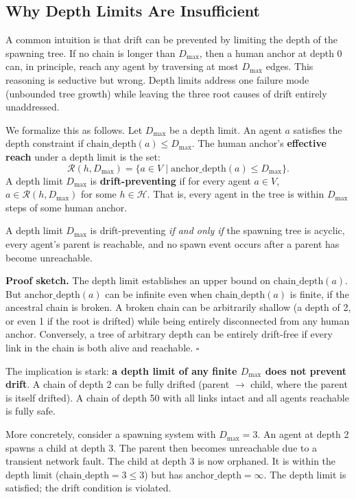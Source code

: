 \subsection{Why Depth Limits Are Insufficient}

A common intuition is that drift can be prevented by limiting the depth of the spawning tree. If no chain is longer than $D_{\max}$, then a human anchor at depth $0$ can, in principle, reach any agent by traversing at most $D_{\max}$ edges. This reasoning is seductive but wrong. Depth limits address one failure mode (unbounded tree growth) while leaving the three root causes of drift entirely unaddressed.

We formalize this as follows. Let $D_{\max}$ be a depth limit. An agent $a$ satisfies the depth constraint if $\text{chain\_depth}(a) \leq D_{\max}$. The human anchor's \textbf{effective reach} under a depth limit is the set:
\[
\mathcal{R}(h, D_{\max}) = \{ a \in V \mid \text{anchor\_depth}(a) \leq D_{\max} \}.
\]
A depth limit $D_{\max}$ is \textbf{drift-preventing} if for every agent $a \in V$, $a \in \mathcal{R}(h, D_{\max})$ for some $h \in \mathcal{H}$. That is, every agent in the tree is within $D_{\max}$ steps of some human anchor.

\begin{claim}
A depth limit $D_{\max}$ is drift-preventing \emph{if and only if} the spawning tree is acyclic, every agent's parent is reachable, and no spawn event occurs after a parent has become unreachable.
\end{claim}

\textbf{Proof sketch.} The depth limit establishes an upper bound on $\text{chain\_depth}(a)$. But $\text{anchor\_depth}(a)$ can be infinite even when $\text{chain\_depth}(a)$ is finite, if the ancestral chain is broken. A broken chain can be arbitrarily shallow (a depth of 2, or even 1 if the root is drifted) while being entirely disconnected from any human anchor. Conversely, a tree of arbitrary depth can be entirely drift-free if every link in the chain is both alive and reachable. $\square$

The implication is stark: \textbf{a depth limit of any finite $D_{\max}$ does not prevent drift}. A chain of depth 2 can be fully drifted (parent $\rightarrow$ child, where the parent is itself drifted). A chain of depth 50 with all links intact and all agents reachable is fully safe.

More concretely, consider a spawning system with $D_{\max} = 3$. An agent at depth 2 spawns a child at depth 3. The parent then becomes unreachable due to a transient network fault. The child at depth 3 is now orphaned. It is within the depth limit ($\text{chain\_depth} = 3 \leq 3$) but has $\text{anchor\_depth} = \infty$. The depth limit is satisfied; the drift condition is violated.

